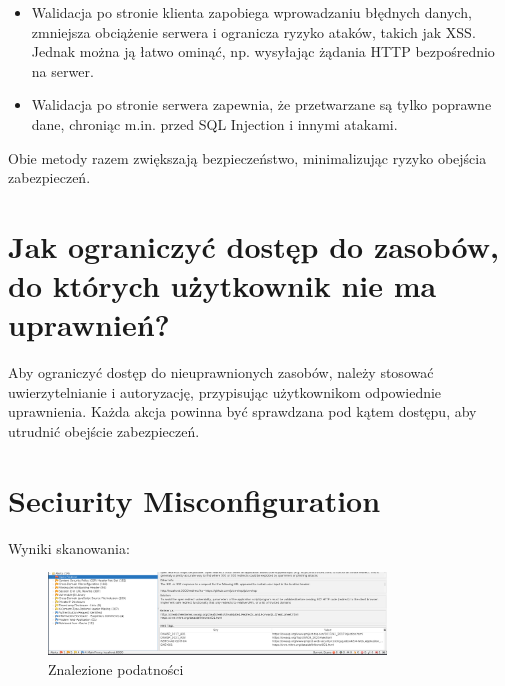\documentclass{article}
\begin{document}
\begin{itemize}
    \item Walidacja po stronie klienta zapobiega wprowadzaniu błędnych danych, zmniejsza obciążenie serwera i ogranicza ryzyko ataków, takich jak XSS. Jednak można ją łatwo ominąć, np. wysyłając żądania HTTP bezpośrednio na serwer.
    \item Walidacja po stronie serwera zapewnia, że przetwarzane są tylko poprawne dane, chroniąc m.in. przed SQL Injection i innymi atakami.
\end{itemize}

Obie metody razem zwiększają bezpieczeństwo, minimalizując ryzyko obejścia zabezpieczeń.

\section*{Jak ograniczyć dostęp do zasobów, do których użytkownik nie ma uprawnień?}
Aby ograniczyć dostęp do nieuprawnionych zasobów, należy stosować uwierzytelnianie i autoryzację, przypisując użytkownikom odpowiednie uprawnienia. Każda akcja powinna być sprawdzana pod kątem dostępu, aby utrudnić obejście zabezpieczeń.
\section*{Seciurity Misconfiguration}
Wyniki skanowania:
\begin{figure}[H]
    \centering
    \includegraphics[width=0.8\textwidth]{open_redirect.png}
    \caption{Znalezione podatności}
\end{figure}
\end{document}

